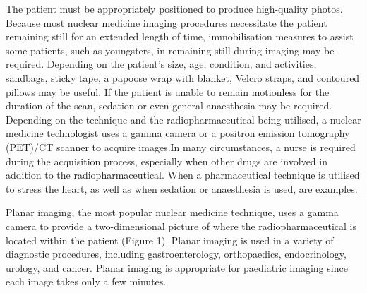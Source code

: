 \documentclass[12pt]{article}
\begin{document}
\par
The patient must be appropriately positioned to produce high-quality photos. Because most nuclear medicine imaging procedures necessitate the patient remaining still for an extended length of time, immobilisation measures to assist some patients, such as youngsters, in remaining still during imaging may be required. Depending on the patient's size, age, condition, and activities, sandbags, sticky tape, a papoose wrap with blanket, Velcro straps, and contoured pillows may be useful. If the patient is unable to remain motionless for the duration of the scan, sedation or even general anaesthesia may be required. Depending on the technique and the radiopharmaceutical being utilised, a nuclear medicine technologist uses a gamma camera or a positron emission tomography (PET)/CT scanner to acquire images.In many circumstances, a nurse is required during the acquisition process, especially when other drugs are involved in addition to the radiopharmaceutical. When a pharmaceutical technique is utilised to stress the heart, as well as when sedation or anaesthesia is used, are examples.
\par
Planar imaging, the most popular nuclear medicine technique, uses a gamma camera to provide a two-dimensional picture of where the radiopharmaceutical is located within the patient (Figure 1). Planar imaging is used in a variety of diagnostic procedures, including gastroenterology, orthopaedics, endocrinology, urology, and cancer. Planar imaging is appropriate for paediatric imaging since each image takes only a few minutes.
\end{document}
